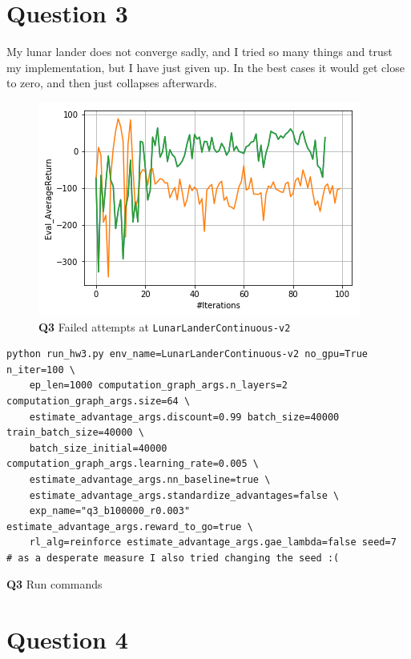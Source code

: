 \documentclass[11pt]{article}
\begin{document}
\clearpage
\section{Question 3}
\label{sec:org302d208}
My lunar lander does not converge sadly, and I tried so many things and trust my implementation, but I have just given up. In the best cases it would get close to zero, and then just collapses afterwards.

\begin{figure}[htbp]
\centering
\includegraphics[width=.9\linewidth]{./3.png}
\caption{\textbf{Q3} Failed attempts at \texttt{LunarLanderContinuous-v2}}
\end{figure}

\begin{listing}[htbp]
\begin{verbatim}
python run_hw3.py env_name=LunarLanderContinuous-v2 no_gpu=True n_iter=100 \
    ep_len=1000 computation_graph_args.n_layers=2 computation_graph_args.size=64 \
    estimate_advantage_args.discount=0.99 batch_size=40000 train_batch_size=40000 \
    batch_size_initial=40000 computation_graph_args.learning_rate=0.005 \
    estimate_advantage_args.nn_baseline=true \
    estimate_advantage_args.standardize_advantages=false \
    exp_name="q3_b100000_r0.003" estimate_advantage_args.reward_to_go=true \
    rl_alg=reinforce estimate_advantage_args.gae_lambda=false seed=7
# as a desperate measure I also tried changing the seed :(
\end{verbatim}
\caption{\textbf{Q3} Run commands}
\end{listing}

\clearpage
\section{Question 4}
\label{sec:orgd120cc7}
\end{document}
